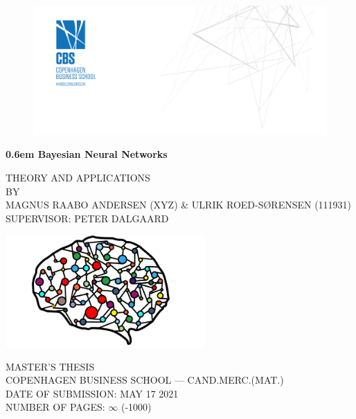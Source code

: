 \documentclass[a4paper]{book}
\numberwithin{mytheorem}{chapter}
\numberwithin{equation}{section}
\begin{document}
\begin{titlepage}
\clearpage
\newcommand\nbvspace[1][3]{\vspace*{\stretch{#1}}}
\newcommand\nbstretchyspace{\spaceskip0.5em plus 0.25em minus 0.25em}
\newcommand{\nbtitlestretch}{\spaceskip0.6em}
\thispagestyle{empty}
\begin{center}
\begin{figure}
\begin{center}
\includegraphics[scale=0.55]{pics/CBS.jpg}
\end{center} 
\end{figure}
	\bfseries
	\Huge
	{\nbtitlestretch\huge
	 Bayesian Neural Networks}
	 \nbvspace[1]
	\normalsize
	
	THEORY AND APPLICATIONS\\
	\footnotesize BY\\
	\footnotesize MAGNUS RAABO ANDERSEN (XYZ) \& ULRIK ROED-SØRENSEN (111931)\\[0.5em]
	\footnotesize SUPERVISOR: PETER DALGAARD
	
	\nbvspace[1]
	
	\includegraphics[width=3in]{pics/neural_network.png}
	\nbvspace[1]
	
	MASTER'S THESIS \\ 
	COPENHAGEN BUSINESS SCHOOL --- CAND.MERC.(MAT.)\\
    \nbvspace[1]
    DATE OF SUBMISSION: MAY 17 2021\\
    NUMBER OF PAGES: $\infty$ (-1000)
	
	\nbvspace[1]
\end{center}
\end{titlepage}
\end{document}
